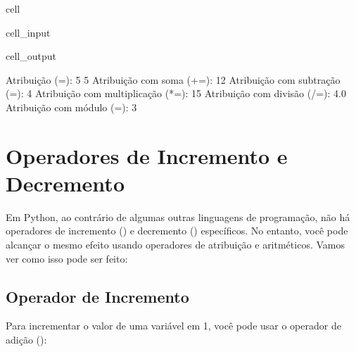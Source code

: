 \documentclass[letterpaper,10pt,english]{jupyterBook}
\begin{document}
\begin{sphinxuseclass}{cell}
\begin{sphinxVerbatimInput}
\begin{sphinxuseclass}{cell_input}
\end{sphinxuseclass}\end{sphinxVerbatimInput}
\begin{sphinxVerbatimOutput}

\begin{sphinxuseclass}{cell_output}
\begin{sphinxVerbatim}[commandchars=\\\{\}]
Atribuição (=): 5 5
Atribuição com soma (+=): 12
Atribuição com subtração (\PYGZhy{}=): 4
Atribuição com multiplicação (*=): 15
Atribuição com divisão (/=): 4.0
Atribuição com módulo (\PYGZpc{}=): 3
\end{sphinxVerbatim}

\end{sphinxuseclass}\end{sphinxVerbatimOutput}

\end{sphinxuseclass}

\section{Operadores de Incremento e Decremento}
\label{\detokenize{chapters/ch3/ch3:operadores-de-incremento-e-decremento}}
\sphinxAtStartPar
Em Python, ao contrário de algumas outras linguagens de programação, não há operadores de incremento (\sphinxcode{\sphinxupquote{++}}) e decremento (\sphinxcode{\sphinxupquote{\sphinxhyphen{}\sphinxhyphen{}}}) específicos. No entanto, você pode alcançar o mesmo efeito usando operadores de atribuição e aritméticos. Vamos ver como isso pode ser feito:


\subsection{Operador de Incremento}
\label{\detokenize{chapters/ch3/ch3:operador-de-incremento}}
\sphinxAtStartPar
Para incrementar o valor de uma variável em 1, você pode usar o operador de adição (\sphinxcode{\sphinxupquote{+=}}):

\begin{sphinxVerbatim}[commandchars=\\\{\}]
  
    
\end{sphinxVerbatim}
\end{document}
